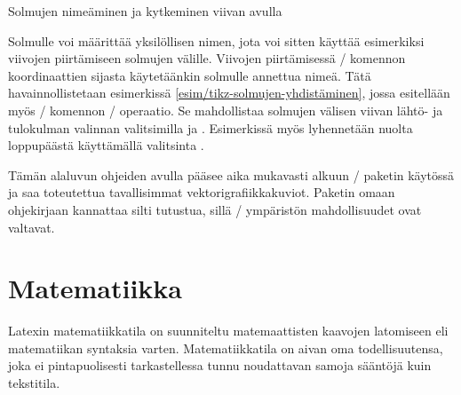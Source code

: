 \begin{esimerkki*}

\begin{koodilohko}
\end{koodilohko}

  \begin{tulossis}
  \end{tulossis}

  \caption{Solmujen nimeäminen ja kytkeminen viivan avulla}
  \label{esim/tikz-solmujen-yhdistäminen}
\end{esimerkki*}

Solmulle voi määrittää yksilöllisen nimen, jota voi sitten käyttää
esimerkiksi viivojen piirtämiseen solmujen välille. Viivojen
piirtämisessä \-/ komennon koordinaattien sijasta
käytetäänkin solmulle annettua nimeä. Tätä havainnollistetaan
esimerkissä \ref{esim/tikz-solmujen-yhdistäminen}, jossa esitellään myös
\-/ komennon \-/ operaatio. Se mahdollistaa
solmujen välisen viivan lähtö- ja tulokulman valinnan valitsimilla
 ja . Esimerkissä myös lyhennetään nuolta
loppupäästä käyttämällä valitsinta .

Tämän alaluvun ohjeiden avulla pääsee aika mukavasti alkuun
\-/ paketin käytössä ja saa toteutettua tavallisimmat
vektorigrafiikkakuviot. Paketin omaan ohjekirjaan kannattaa silti
tutustua, sillä \-/ ympäristön mahdollisuudet
ovat valtavat.

\section{Matematiikka}
\label{luku/matematiikka}

Latexin matematiikkatila on suunniteltu matemaattisten kaavojen
latomiseen eli matematiikan syntaksia varten. Matematiikkatila on aivan
oma todellisuutensa, joka ei pintapuolisesti tarkastellessa tunnu
noudattavan samoja sääntöjä kuin tekstitila.

